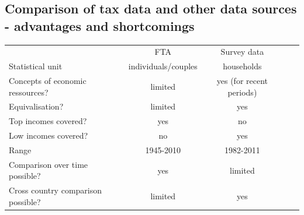 \documentclass[twoside]{article}\usepackage[]{graphicx}\usepackage[]{color}
\begin{document}
\begin{multicols}{2}
\subsection{Comparison of tax data and other data sources - advantages and shortcomings}



\begin{table}[h]
\begin{tabular}{lcccc}
                                   & FTA       & Survey data\\
Statistical unit                   & individuals/couples  & households\\                                   
Concepts of economic ressources?   & limited   & yes (for recent periods)\\
Equivalisation?                    & limited   & yes\\
Top incomes covered?               & yes       & no\\
Low incomes covered?               & no        & yes\\
Range                              & 1945-2010 & 1982-2011\\
Comparison over time possible? 	   & yes       & limited\\
Cross country comparison possible? & limited   & yes
        
\end{tabular}
\end{table}




\end{multicols}
\end{document}
